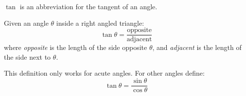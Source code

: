 $\tan$ is an abbreviation for the tangent of an angle.
\par
Given an angle $\theta$ inside a right angled triangle:
$$\tan \theta = \frac{\mbox{opposite}}{\mbox{adjacent}}$$
where \emph{opposite} is the length of the side opposite $\theta$, and \emph{adjacent} is the length of the side next to $\theta$. 		
\par
This definition only works for acute angles. For other angles define:
$$
\tan \theta = \frac{\sin \theta}{\cos \theta}
$$
  